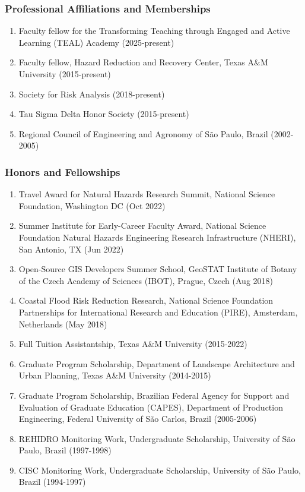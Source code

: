 \documentclass[11pt,oneside]{article}
\begin{document}
\subsubsection{Professional Affiliations and Memberships}
\begin{enumerate}[leftmargin=40pt]
\item {Faculty fellow for the Transforming Teaching through Engaged and Active Learning (TEAL) Academy} (2025-present)
\item Faculty fellow, Hazard Reduction and Recovery Center, Texas A\&M University (2015-present)
\item Society for Risk Analysis (2018-present)
\item Tau Sigma Delta Honor Society (2015-present)
\item Regional Council of Engineering and Agronomy of São Paulo, Brazil (2002-2005)
\end{enumerate}

\subsubsection{Honors and Fellowships}
\begin{enumerate}[leftmargin=40pt]
\item {Travel Award for Natural Hazards Research Summit}, National Science Foundation, Washington DC (Oct 2022)
\item {Summer Institute for Early-Career Faculty Award}, National Science Foundation Natural Hazards Engineering Research Infrastructure (NHERI), San Antonio, TX (Jun 2022)
\item {Open-Source GIS Developers Summer School}, GeoSTAT Institute of Botany of the Czech Academy of Sciences (IBOT), Prague, Czech (Aug 2018)
\item {Coastal Flood Risk Reduction Research}, National Science Foundation Partnerships for International Research and Education (PIRE), Amsterdam, Netherlands (May 2018)
\item {Full Tuition Assistantship}, Texas A\&M University (2015-2022)
\item {Graduate Program Scholarship}, Department of Landscape Architecture and Urban Planning, Texas A\&M University (2014-2015)
\item {Graduate Program Scholarship}, Brazilian Federal Agency for Support and Evaluation of Graduate Education (CAPES), Department of Production Engineering, Federal University of São Carlos, Brazil (2005-2006)
\item {REHIDRO Monitoring Work, Undergraduate Scholarship}, University of São Paulo, Brazil (1997-1998)
\item {CISC Monitoring Work, Undergraduate Scholarship}, University of São Paulo, Brazil (1994-1997)
\end{enumerate}
\end{document}

